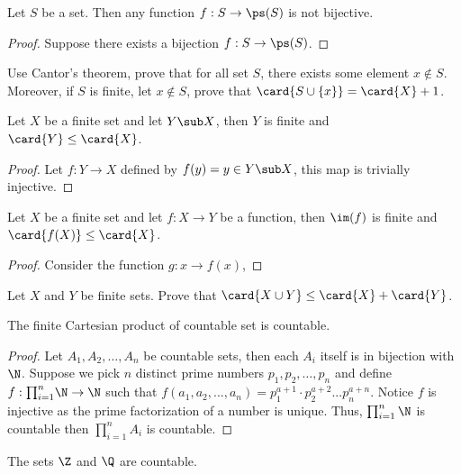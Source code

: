 \documentclass[10pt]{article}
\begin{document}
\begin{theorem}
    Let $S$ be a set. Then any function $f:S\to\ps(S)$ is not bijective.
\end{theorem}
\begin{proof}
    Suppose there exists a bijection $f:S\to\ps(S)$.
    

\end{proof}
\begin{problem}
    Use Cantor's theorem, prove that for all set $S$, there exists some element $x\notin S$. Moreover, if $S$ is finite, let $x\notin S$, prove that $\card{S\cup\{x\}}=\card{X}+1$.
\end{problem}
\begin{proposition}
    Let $X$ be a finite set and let $Y\sub X$, then $Y$ is finite and $\card{Y}\le\card{X}$.
\end{proposition}
\begin{proof}
    Let $f:Y\to X$ defined by $f(y)=y\in Y\sub X$, this map is trivially injective.
\end{proof}
\begin{proposition}
    Let $X$ be a finite set and let $f:X\to Y$ be a function, then $\im(f)$ is finite and $\card{f(X)}\le\card{X}$.
\end{proposition}
\begin{proof}
    Consider the function $g:x\to f(x)$, 
\end{proof}
\begin{problem}
    Let $X$ and $Y$ be finite sets. Prove that $\card{X\cup Y}\le\card{X}+\card{Y}$.
\end{problem}
\begin{proposition}
    The finite Cartesian product of countable set is countable.
\end{proposition}
\begin{proof}
    Let ${A}_{1},{A}_{2},\dots,{A}_{n}$ be countable sets, then each ${A}_{i}$ itself is in bijection with $\N$. Suppose we pick $n$ distinct prime numbers ${p}_{1},{p}_{2},\dots,{p}_{n}$ and define $f:{\prod}_{i=1}^{n}\N\to\N$ such that $f({a}_{1}, a_2,..., a_n) = p_1^{a+1}\cdot p_2^{a+2}...p_n^{a+n}$.
    Notice $f$ is injective as the prime factorization of a number is unique.
    Thus, $\prod_{i=1}^{n}\N$ is countable then $\prod_{i=1}^{n}A_i$ is countable.
\end{proof}
\begin{proposition} 
    The sets $\Z$ and $\Q$ are countable.
\end{proposition}
\end{document}
